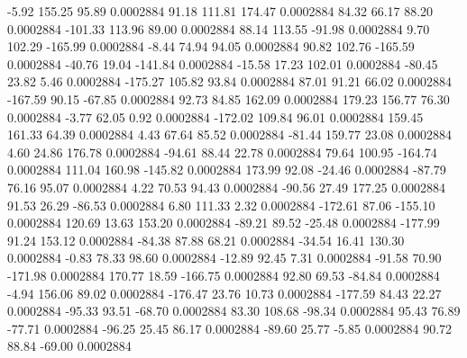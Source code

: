        -5.92      155.25       95.89     0.0002884
       91.18      111.81      174.47     0.0002884
       84.32       66.17       88.20     0.0002884
     -101.33      113.96       89.00     0.0002884
       88.14      113.55      -91.98     0.0002884
        9.70      102.29     -165.99     0.0002884
       -8.44       74.94       94.05     0.0002884
       90.82      102.76     -165.59     0.0002884
      -40.76       19.04     -141.84     0.0002884
      -15.58       17.23      102.01     0.0002884
      -80.45       23.82        5.46     0.0002884
     -175.27      105.82       93.84     0.0002884
       87.01       91.21       66.02     0.0002884
     -167.59       90.15      -67.85     0.0002884
       92.73       84.85      162.09     0.0002884
      179.23      156.77       76.30     0.0002884
       -3.77       62.05        0.92     0.0002884
     -172.02      109.84       96.01     0.0002884
      159.45      161.33       64.39     0.0002884
        4.43       67.64       85.52     0.0002884
      -81.44      159.77       23.08     0.0002884
        4.60       24.86      176.78     0.0002884
      -94.61       88.44       22.78     0.0002884
       79.64      100.95     -164.74     0.0002884
      111.04      160.98     -145.82     0.0002884
      173.99       92.08      -24.46     0.0002884
      -87.79       76.16       95.07     0.0002884
        4.22       70.53       94.43     0.0002884
      -90.56       27.49      177.25     0.0002884
       91.53       26.29      -86.53     0.0002884
        6.80      111.33        2.32     0.0002884
     -172.61       87.06     -155.10     0.0002884
      120.69       13.63      153.20     0.0002884
      -89.21       89.52      -25.48     0.0002884
     -177.99       91.24      153.12     0.0002884
      -84.38       87.88       68.21     0.0002884
      -34.54       16.41      130.30     0.0002884
       -0.83       78.33       98.60     0.0002884
      -12.89       92.45        7.31     0.0002884
      -91.58       70.90     -171.98     0.0002884
      170.77       18.59     -166.75     0.0002884
       92.80       69.53      -84.84     0.0002884
       -4.94      156.06       89.02     0.0002884
     -176.47       23.76       10.73     0.0002884
     -177.59       84.43       22.27     0.0002884
      -95.33       93.51      -68.70     0.0002884
       83.30      108.68      -98.34     0.0002884
       95.43       76.89      -77.71     0.0002884
      -96.25       25.45       86.17     0.0002884
      -89.60       25.77       -5.85     0.0002884
       90.72       88.84      -69.00     0.0002884
